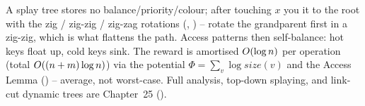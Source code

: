 \begin{recallbox}
A splay tree stores no balance/priority/colour; after touching $x$ you  it to the root with the
zig / zig-zig / zig-zag rotations (, ) -- rotate the grandparent first
in a zig-zig, which is what flattens the path. Access patterns then self-balance: hot keys float up, cold
keys sink. The reward is amortised $O(\log n)$ per operation (total $O((n+m)\log n)$) via the
potential $\Phi=\sum_v \log\mathit{size}(v)$ and the Access Lemma () -- average, not
worst-case. Full analysis, top-down splaying, and link-cut dynamic trees are Chapter~25 ().
\end{recallbox}
